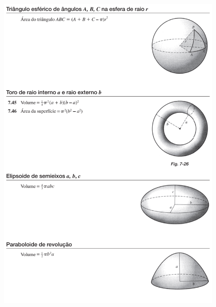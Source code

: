 \begin{figure}[H]
    \centering
    \includegraphics[width=\textwidth]{matematica/geometria/formulas6}
\end{figure}